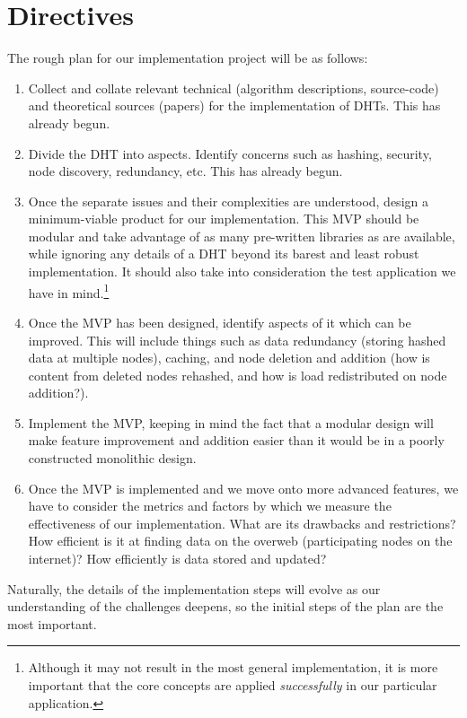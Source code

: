 \documentclass[12pt]{report}
\begin{document}
    \section{Directives}
    The rough plan for our implementation project will be as follows:
    \begin{enumerate}
        \item Collect and collate relevant technical (algorithm descriptions,
            source-code) and theoretical sources (papers) for the implementation
            of DHTs.  This has already begun.
        \item Divide the DHT into aspects.  Identify concerns such as hashing,
            security, node discovery, redundancy, etc.  This has already begun.
        \item Once the separate issues and their complexities are understood,
            design a minimum-viable product for our implementation.  This MVP
            should be modular and take advantage of as many pre-written
            libraries as are available, while ignoring any details of a DHT
            beyond its barest and least robust implementation.  It should also
            take into consideration the test application we have in
            mind.\footnote{Although it may not result in the most general implementation, it is
            more important that the core concepts are applied
            \textit{successfully} in our particular application.}
        \item Once the MVP has been designed, identify aspects of it which can
            be improved.  This will include things such as data redundancy
            (storing hashed data at multiple nodes), caching, and node
            deletion and addition (how is content from deleted nodes rehashed,
            and how is load redistributed on node addition?).
        \item Implement the MVP, keeping in mind the fact that a
            modular design will make feature improvement and addition easier
            than it would be in a poorly constructed monolithic design.
        \item Once the MVP is implemented and we move onto more advanced
            features, we have to consider the metrics and factors by which we
            measure the effectiveness of our implementation.  What are its
            drawbacks and restrictions?  How efficient is it at finding data on
            the overweb (participating nodes on the internet)?  How efficiently is
            data stored and updated?
    \end{enumerate}
    Naturally, the details of the implementation steps will evolve as our
    understanding of the challenges deepens, so the initial steps of the plan
    are the most important.
\end{document}
